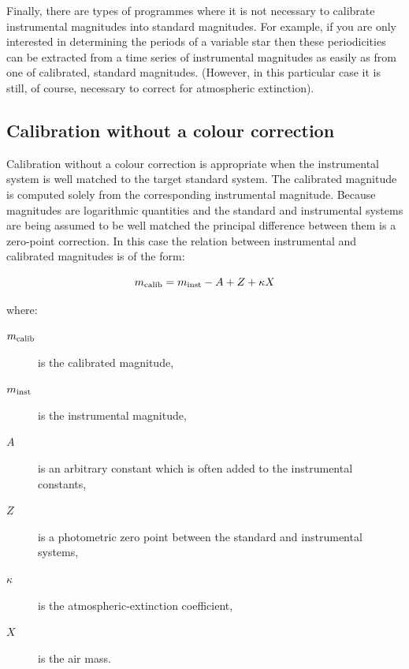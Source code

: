 \documentclass[twoside,11pt]{article}
\begin{document}
Finally, there are types of programmes where it is not necessary to
calibrate instrumental magnitudes into standard magnitudes.  For
example, if you are only interested in determining the periods of a
variable star then these periodicities can be extracted from a time
series of instrumental magnitudes as easily as from one of calibrated,
standard magnitudes.  (However, in this particular case it is still, of
course, necessary to correct for atmospheric extinction).

\subsection{Calibration without a colour correction}

Calibration without a colour correction is appropriate when the
instrumental system is well matched to the target standard system.  The
calibrated magnitude is computed solely from the corresponding
instrumental magnitude.  Because magnitudes are logarithmic quantities
and the standard and instrumental systems are being assumed to be well
matched the principal difference between them is a zero-point correction.
In this case the relation between instrumental and calibrated magnitudes
is of the form:

\begin{equation}
m_{\rm calib} = m_{\rm inst} - A + Z + \kappa X
\label{CALIBEQN}
\end{equation}

where:

\begin{description}

  \item[$m_{\rm calib}$] is the calibrated magnitude,

  \item[$m_{\rm inst}$] is the instrumental magnitude,

  \item[$A$] is an arbitrary constant which is often added to the
   instrumental constants,

  \item[$Z$] is a photometric zero point between the standard and
   instrumental systems,

  \item[$\kappa$] is the atmospheric-extinction coefficient,

  \item[$X$] is the air mass.

\end{description}
\end{document}
